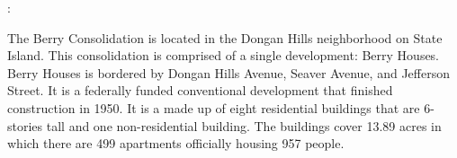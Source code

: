 :       

     

The Berry Consolidation is located in the Dongan Hills neighborhood on State Island. This consolidation is comprised of a single development: Berry Houses. Berry Houses is bordered by Dongan Hills Avenue, Seaver Avenue, and Jefferson Street. It is a federally funded conventional development that finished construction in 1950. It is a made up of eight residential buildings that are 6- stories tall and one non-residential building. The buildings cover 13.89 acres in which there are 499 apartments officially housing 957 people.   

 